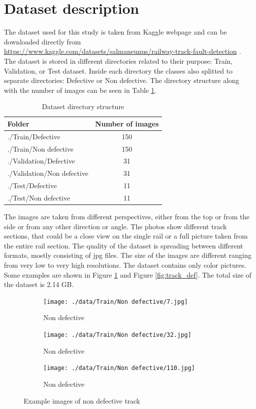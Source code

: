 \documentclass[10pt, final]{article}
\begin{document}
	\section{Dataset description} \label{sec:data_desc}
		The dataset used for this study is taken from Kaggle webpage \cite{noauthor_kaggle_nodate}
		and can be downloaded directly from 
		\url{https://www.kaggle.com/datasets/salmaneunus/railway-track-fault-detection}
		\cite*{noauthor_railway_nodate}.
		The dataset is stored in different directories related to their purpose: Train, Validation,
		or Test dataset.
		Inside each directory the classes also splitted to separate directories: Defective or Non defective.
		The directory structure along with the number of images can be seen in Table \ref{table:dir_struct}.
		\begin{table}[!ht]
			\centering
			\begin{tabular}{l c}
				Folder & Number of images \\
				\hline
				./Train/Defective & 150 \\
				./Train/Non defective & 150 \\
				./Validation/Defective & 31 \\
				./Validation/Non defective & 31 \\
				./Test/Defective & 11 \\
				./Test/Non defective & 11 \\
				\hline
			\end{tabular}
			\caption{Dataset directory structure}
			\label{table:dir_struct}
		\end{table}
		The images are taken from different perspectives, either from the top or from the side or from 
		any other direction or angle.
		The photos show different track sections, that could be a close view on the single rail or 
		a full picture taken from the entire rail section.
		The quality of the dataset is spreading between different formats, mostly consisting of jpg files.
		The size of the images are different ranging from very low to very high resolutions.
		The dataset contains only color pictures.
		Some examples are shown in Figure \ref{fig:track_non_def} and Figure \ref{fig:track_def}.
		The total size of the dataset is 2.14 GB.
		\begin{figure}[!ht]
			\centering
			\begin{subfigure}{0.3\textwidth}
				\centering
				\texttt{[image: ./data/Train/Non defective/7.jpg]}
				\caption{Non defective}
			\end{subfigure}
			\begin{subfigure}{0.3\textwidth}
				\centering
				\texttt{[image: ./data/Train/Non defective/32.jpg]}
				\caption{Non defective}
			\end{subfigure}
			\begin{subfigure}{0.3\textwidth}
				\centering
				\texttt{[image: ./data/Train/Non defective/110.jpg]}
				\caption{Non defective}
			\end{subfigure}
			\caption{Example images of non defective track}
			\label{fig:track_non_def}
		\end{figure}
\end{document}
